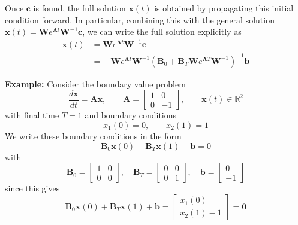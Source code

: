 Once $\mathbf{c}$ is found, the full solution $\mathbf{x}(t)$ is obtained by propagating this initial condition forward. In particular, combining this with the general solution $\mathbf{x}(t) = \mathbf{W}e^{\mathbf{\Lambda} t}\mathbf{W}^{-1}\mathbf{c}$, we can write the full solution explicitly as
\begin{align}
    \mathbf{x}(t)
    &= \mathbf{W} e^{\mathbf{\Lambda} t} \mathbf{W}^{-1} \mathbf{c} \nonumber \\
    &= -\,\mathbf{W} e^{\mathbf{\Lambda} t} \mathbf{W}^{-1}
       \left( \mathbf{B}_0 + \mathbf{B}_T \mathbf{W} e^{\mathbf{\Lambda} T} \mathbf{W}^{-1} \right)^{-1}
       \mathbf{b}
\end{align}


\begin{exampleBox}
    \textbf{Example: }
    Consider the boundary value problem
    \begin{equation}
        \frac{d\mathbf{x}}{dt} = \mathbf{A}\mathbf{x},\qquad
        \mathbf{A} = \begin{bmatrix}1 & 0\\[4pt] 0 & -1\end{bmatrix},\qquad
        \mathbf{x}(t) \in \mathbb{R}^2
    \end{equation}
    with final time $T=1$ and boundary conditions
    \begin{equation}
        x_1(0) = 0,\qquad x_2(1) = 1
    \end{equation}
    We write these boundary conditions in the form
    \begin{equation}
        \mathbf{B}_0 \mathbf{x}(0) + \mathbf{B}_T \mathbf{x}(1) + \mathbf{b} = 0
    \end{equation}
    with
    \begin{equation}
        \mathbf{B}_0 = \begin{bmatrix}1 & 0\\[4pt] 0 & 0\end{bmatrix},\quad
        \mathbf{B}_T = \begin{bmatrix}0 & 0\\[4pt] 0 & 1\end{bmatrix},\quad
        \mathbf{b} = \begin{bmatrix}0\\[4pt] -1\end{bmatrix}
    \end{equation}
    since this gives
    \begin{equation}
        \mathbf{B}_0\mathbf{x}(0) + \mathbf{B}_T\mathbf{x}(1) + \mathbf{b}
        =
        \begin{bmatrix}x_1(0)\\[4pt] x_2(1) - 1\end{bmatrix}
        = \mathbf{0}
    \end{equation}


\end{exampleBox}
